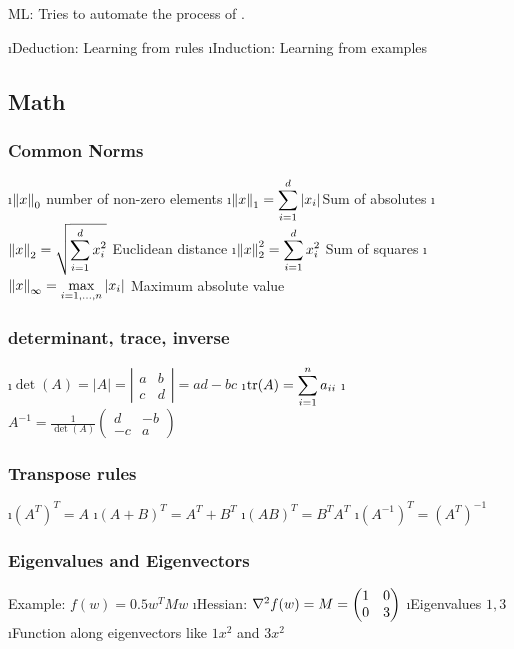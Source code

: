 
ML: Tries to automate the process of .

\be
\i Deduction: Learning from rules
\i Induction: Learning from examples
\ee

\subsection{Math}

\subsubsection{Common Norms}

\bi
\i $\left\lVert x\right\rVert_0$ \quad\qquad\qquad\qquad number of non-zero elements
\i $\left\lVert x\right\rVert_1 = \displaystyle\sum_{i=1}^d \left|x_i\right|$\qquad\qquad Sum of absolutes
\i $\left\lVert x\right\rVert_2 = \sqrt{\displaystyle\sum_{i=1}^d x_i^2}$ \qquad \quad Euclidean distance
\i $\left\lVert x\right\rVert^2_2 = \displaystyle\sum_{i=1}^d x_i^2$ \qquad\qquad Sum of squares
\i $\left\lVert x\right\rVert_\infty = \displaystyle\max_{i = 1,...,n} \left|x_i\right|$ \qquad Maximum absolute value
\ei

\subsubsection{determinant, trace, inverse}

\bi
\i $\det(A) = \left|A\right| = \left| \begin{array}{cc} a & b\\c & d \end{array}\right| = ad-bc$
\i $\operatorname*{tr}(A) = \displaystyle\sum_{i=1}^n a_{ii}$
\i $A^{-1} = \frac{1}{\det(A)} \left(\begin{array}{cc} d & -b\\-c & a \end{array}\right)$
\ei

\subsubsection{Transpose rules}

\bi
\i $(A^T)^T = A$
\i $(A+B)^T = A^T + B^T$
\i $(AB)^T = B^T A^T$
\i $(A^{-1})^T = (A^T)^{-1}$
\ei

\subsubsection{Eigenvalues and Eigenvectors}

Example: $f(w) = 0.5 w^TMw$
\bi
\i Hessian: $\nabla^2 f(w) = M = \begin{pmatrix} 1 & 0 \\ 0 & 3 \end{pmatrix}$
\i Eigenvalues $1,3$
\i Function along eigenvectors like $1x^2$ and $3x^2$
\ei

